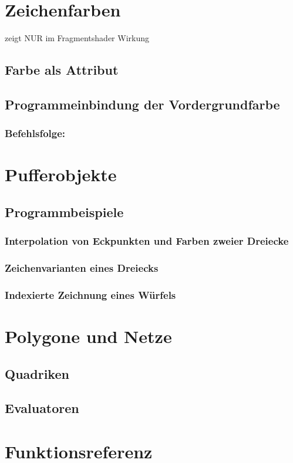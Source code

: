 \section{Zeichenfarben}
zeigt NUR im Fragmentshader Wirkung
\subsection{Farbe als Attribut}
\subsection{Programmeinbindung der Vordergrundfarbe}
\subsubsection*{Befehlsfolge:}

\section{Pufferobjekte}
\subsection{Programmbeispiele}
\subsubsection*{Interpolation von Eckpunkten und Farben zweier Dreiecke}
\subsubsection*{Zeichenvarianten eines Dreiecks}
\subsubsection*{Indexierte Zeichnung eines Würfels}

\section{Polygone und Netze}
\subsection{Quadriken}
\subsection{Evaluatoren}

\section{Funktionsreferenz}




